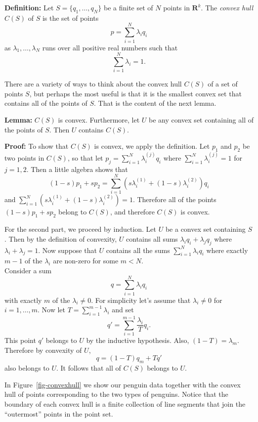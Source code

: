 \documentclass[
  11pt,
  letterpaper,
]{scrbook}
\theoremstyle{plain}
\theoremstyle{remark}
\begin{document}
\textbf{Definition:} Let \(S=\{q_1,\ldots, q_{N}\}\) be a finite set of
\(N\) points in \(\mathbf{R}^{k}\). The \emph{convex hull} \(C(S)\) of
\(S\) is the set of points \[
p = \sum_{i=1}^{N} \lambda_{i}q_{i}
\] as \(\lambda_{1},\ldots,\lambda_{N}\) runs over all positive real
numbers such that \[
\sum_{i=1}^{N} \lambda_{i} = 1.
\]

There are a variety of ways to think about the convex hull \(C(S)\) of a
set of points \(S\), but perhaps the most useful is that it is the
smallest convex set that contains all of the points of \(S\). That is
the content of the next lemma.

\textbf{Lemma:} \(C(S)\) is convex. Furthermore, let \(U\) be any convex
set containing all of the points of \(S\). Then \(U\) contains \(C(S)\).

\textbf{Proof:} To show that \(C(S)\) is convex, we apply the
definition. Let \(p_1\) and \(p_2\) be two points in \(C(S)\), so that
let \(p_{j}=\sum_{i=1}^{N} \lambda^{(j)}_{i}q_{i}\) where
\(\sum_{i=1}^{N}\lambda^{(j)}_{i} = 1\) for \(j=1,2\). Then a little
algebra shows that \[
(1-s)p_1+sp_{2} = \sum_{i=1}^{N} (s\lambda^{(1)}_{i}+(1-s)\lambda^{(2)}_{i})q_{i}
\] and
\(\sum_{i=1}^{N} (s\lambda^{(1)}_{i}+(1-s)\lambda^{(2)}_{i}) = 1\).
Therefore all of the points \((1-s)p_{1}+sp_{2}\) belong to \(C(S)\),
and therefore \(C(S)\) is convex.

For the second part, we proceed by induction. Let \(U\) be a convex set
containing \(S\). Then by the definition of convexity, \(U\) contains
all sums \(\lambda_{i}q_{i}+\lambda_{j}q_{j}\) where
\(\lambda_i+\lambda_j=1\). Now suppose that \(U\) contains all the sums
\(\sum_{i=1}^{N} \lambda_{i}q_{i}\) where exactly \(m-1\) of the
\(\lambda_{i}\) are non-zero for some \(m<N\).\\
Consider a sum \[
q = \sum_{i=1}^{N}\lambda_{i}q_{i}
\] with exactly \(m\) of the \(\lambda_{i}\not=0\). For simplicity let's
assume that \(\lambda_{i}\not=0\) for \(i=1,\ldots, m\). Now let
\(T=\sum_{i=1}^{m-1}\lambda_{i}\) and set \[
q' = \sum_{i=1}^{m-1}\frac{\lambda_{i}}{T}q_{i}.
\] This point \(q'\) belongs to \(U\) by the inductive hypothesis. Also,
\((1-T)=\lambda_{m}\). Therefore by convexity of \(U\), \[
q = (1-T)q_{m}+Tq'
\] also belongs to \(U\). It follows that all of \(C(S)\) belongs to
\(U\).

In Figure~\ref{fig-convexhull} we show our penguin data together with
the convex hull of points corresponding to the two types of penguins.
Notice that the boundary of each convex hull is a finite collection of
line segments that join the ``outermost'' points in the point set.
\end{document}

